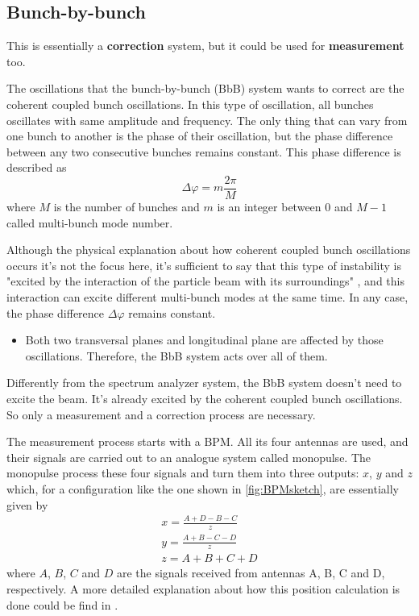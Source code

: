 \subsection{Bunch-by-bunch}
This is essentially a \textbf{correction} system, but it could be used for \textbf{measurement} too.

The oscillations that the bunch-by-bunch (BbB) system wants to correct are the coherent coupled bunch oscillations. In this type of oscillation, all bunches oscillates with same amplitude and frequency. The only thing that can vary from one bunch to another is the phase of their oscillation, but the phase difference between any two consecutive bunches remains constant. This phase difference is described as
\begin{equation}
	\Delta \varphi = m \frac{2\pi}{M}
\end{equation}
where $M$ is the number of bunches and $m$ is an integer between 0 and $M-1$ called multi-bunch mode number.

Although the physical explanation about how coherent coupled bunch oscillations occurs it's not the focus here, it's sufficient to say that this type of instability is "excited by the interaction of the particle beam with its surroundings" \cite{lonza}, and this interaction can excite different multi-bunch modes at the same time. In any case, the phase difference $\Delta \varphi$ remains constant.

\begin{itemize}
	\item Both two transversal planes and longitudinal plane are affected by those oscillations. Therefore, the BbB system acts over all of them.
\end{itemize}

Differently from the spectrum analyzer system, the BbB system doesn't need to excite the beam. It's already excited by the coherent coupled bunch oscillations. So only a measurement and a correction process are necessary.

The measurement process starts with a BPM. All its four antennas are used, and their signals are carried out to an analogue system called monopulse. The monopulse process these four signals and turn them into three outputs: $x$, $y$ and $z$ which, for a configuration like the one shown in \autoref{fig:BPMsketch}, are essentially given by
\begin{align}
	x = \frac{A+D-B-C}{z}\\
	y = \frac{A+B-C-D}{z}\\
	z = A+B+C+D
\end{align}
where $A$, $B$, $C$ and $D$ are the signals received from antennas A, B, C and D, respectively. A more detailed explanation about how this position calculation is done could be find in \cite{digBPMCalculation}.

